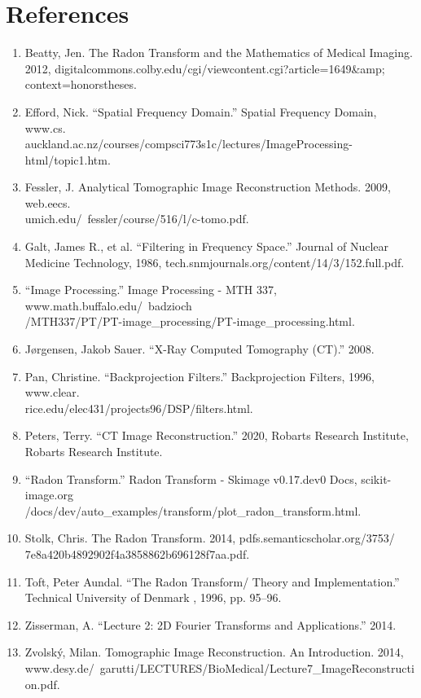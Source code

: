 \documentclass[12pt]{article}
\begin{document}
\section{References}
\begin{enumerate}
	\item Beatty, Jen. The Radon Transform and the Mathematics of Medical Imaging.\\ 2012, digitalcommons.colby.edu/cgi/viewcontent.cgi?article=1649\&amp;\\context=honorstheses.
	\item Efford, Nick. “Spatial Frequency Domain.” Spatial Frequency Domain, www.cs.\\auckland.ac.nz/courses/compsci773s1c/lectures/ImageProcessing-html/topic1.htm.
	\item Fessler, J. Analytical Tomographic Image Reconstruction Methods. 2009, web.eecs.\\umich.edu/~fessler/course/516/l/c-tomo.pdf.
	\item Galt, James R., et al. “Filtering in Frequency Space.” Journal of Nuclear Medicine Technology, 1986, tech.snmjournals.org/content/14/3/152.full.pdf.
	\item “Image Processing.” Image Processing - MTH 337, www.math.buffalo.edu/~badzioch\\/MTH337/PT/PT-image\_processing/PT-image\_processing.html.
	\item Jørgensen, Jakob Sauer. “X-Ray Computed Tomography (CT).” 2008.
	\item Pan, Christine. “Backprojection Filters.” Backprojection Filters, 1996, www.clear.\\rice.edu/elec431/projects96/DSP/filters.html.
	\item Peters, Terry. “CT Image Reconstruction.” 2020, Robarts Research Institute, Robarts Research Institute.
	\item “Radon Transform.” Radon Transform - Skimage v0.17.dev0 Docs, scikit-image.org\\/docs/dev/auto\_examples/transform/plot\_radon\_transform.html.
	\item Stolk, Chris. The Radon Transform. 2014, pdfs.semanticscholar.org/3753/\\7e8a420b4892902f4a3858862b696128f7aa.pdf.
	\item Toft, Peter Aundal. “The Radon Transform/ Theory and Implementation.” Technical University of Denmark , 1996, pp. 95–96.
	\item Zisserman, A. “Lecture 2: 2D Fourier Transforms and Applications.” 2014.
	\item Zvolský, Milan. Tomographic Image Reconstruction. An Introduction. 2014, www.desy.de/~garutti/LECTURES/BioMedical/Lecture7\_ImageReconstruction.pdf.
\end{enumerate}
\end{document}

